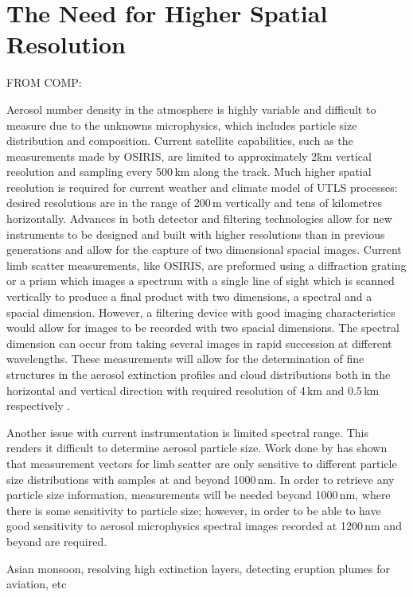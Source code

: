 \section{The Need for Higher Spatial Resolution}

FROM COMP:

Aerosol number density in the atmosphere is highly variable and difficult to measure due to the unknowns microphysics, which includes particle size distribution and composition. Current satellite capabilities, such as the measurements made by OSIRIS, are limited to approximately 2\.km vertical resolution and sampling every 500\,km along the track.  Much higher spatial resolution is required for current weather and climate model of UTLS processes: desired resolutions are in the range of 200\,m vertically and tens of kilometres horizontally.  Advances in both detector and filtering technologies allow for new instruments to be designed and built with higher resolutions than in previous generations and allow for the capture of two dimensional spacial images. Current limb scatter measurements, like OSIRIS, are preformed using a diffraction grating or a prism which images a spectrum with a single line of sight which is scanned vertically to produce a final product with two dimensions, a spectral and a spacial dimension. However, a filtering device with good imaging characteristics would allow for images to be recorded with two spacial dimensions. The spectral dimension can occur from taking several images in rapid succession at different wavelengths. These measurements will allow for the determination of fine structures in the aerosol extinction profiles and cloud distributions both in the horizontal and vertical direction with required resolution of 4\,km and 0.5\,km respectively \citep{Adams2009}.

Another issue with current instrumentation is limited spectral range. This renders it difficult to determine aerosol particle size. Work done by \cite{Rieger2012} has shown that measurement vectors for limb scatter are only sensitive to different particle size distributions with samples at and beyond 1000\,nm. In order to retrieve any particle size information, measurements will be needed beyond 1000\,nm, where there is some sensitivity to particle size; however, in order to be able to have good sensitivity to aerosol microphysics spectral images recorded at 1200\,nm and beyond are required.

Asian monsoon, resolving high extinction layers, detecting eruption plumes for aviation, etc 